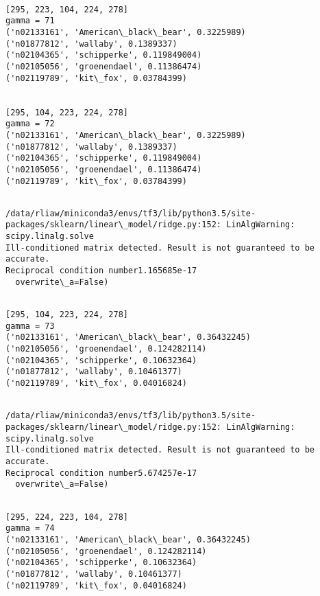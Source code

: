 \documentclass[11pt]{article}
\begin{document}
    \begin{Verbatim}[commandchars=\\\{\}]

[295, 223, 104, 224, 278]
gamma = 71
('n02133161', 'American\_black\_bear', 0.3225989)
('n01877812', 'wallaby', 0.1389337)
('n02104365', 'schipperke', 0.119849004)
('n02105056', 'groenendael', 0.11386474)
('n02119789', 'kit\_fox', 0.03784399)


[295, 104, 223, 224, 278]
gamma = 72
('n02133161', 'American\_black\_bear', 0.3225989)
('n01877812', 'wallaby', 0.1389337)
('n02104365', 'schipperke', 0.119849004)
('n02105056', 'groenendael', 0.11386474)
('n02119789', 'kit\_fox', 0.03784399)


    \end{Verbatim}

    \begin{Verbatim}[commandchars=\\\{\}]
/data/rliaw/miniconda3/envs/tf3/lib/python3.5/site-packages/sklearn/linear\_model/ridge.py:152: LinAlgWarning: scipy.linalg.solve
Ill-conditioned matrix detected. Result is not guaranteed to be accurate.
Reciprocal condition number1.165685e-17
  overwrite\_a=False)

    \end{Verbatim}

    \begin{Verbatim}[commandchars=\\\{\}]

[295, 104, 223, 224, 278]
gamma = 73
('n02133161', 'American\_black\_bear', 0.36432245)
('n02105056', 'groenendael', 0.124282114)
('n02104365', 'schipperke', 0.10632364)
('n01877812', 'wallaby', 0.10461377)
('n02119789', 'kit\_fox', 0.04016824)


    \end{Verbatim}

    \begin{Verbatim}[commandchars=\\\{\}]
/data/rliaw/miniconda3/envs/tf3/lib/python3.5/site-packages/sklearn/linear\_model/ridge.py:152: LinAlgWarning: scipy.linalg.solve
Ill-conditioned matrix detected. Result is not guaranteed to be accurate.
Reciprocal condition number5.674257e-17
  overwrite\_a=False)

    \end{Verbatim}

    \begin{Verbatim}[commandchars=\\\{\}]

[295, 224, 223, 104, 278]
gamma = 74
('n02133161', 'American\_black\_bear', 0.36432245)
('n02105056', 'groenendael', 0.124282114)
('n02104365', 'schipperke', 0.10632364)
('n01877812', 'wallaby', 0.10461377)
('n02119789', 'kit\_fox', 0.04016824)


    \end{Verbatim}
\end{document}

